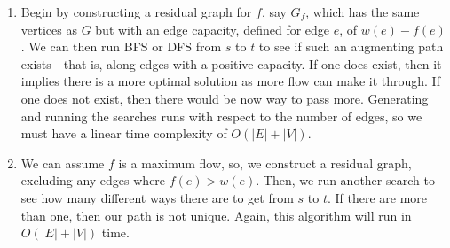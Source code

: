 \documentclass{article}
\begin{document}
\begin{solution}
\begin{enumerate}[label = (\alph*)]
    \item Begin by constructing a residual graph for $f$, say $G_f$, which has the same vertices as $G$ but with an edge capacity, defined for edge $e$, of $w(e) - f(e)$. We can then run BFS or DFS from $s$ to $t$ to see if such an augmenting path exists - that is, along edges with a positive capacity. If one does exist, then it implies there is a more optimal solution as more flow can make it through. If one does not exist, then there would be now way to pass more. Generating and running the searches runs with respect to the number of edges, so we must have a linear time complexity of $O(|E| + |V|)$.

	\item We can assume $f$ is a maximum flow, so, we construct a residual graph, excluding any edges where $f(e) > w(e)$. Then, we run another search to see how many different ways there are to get from $s$ to $t$. If there are more than one, then our path is not unique. Again, this algorithm will run in $O(|E| + |V|)$ time.

\end{enumerate}
\end{solution}
\end{document}
